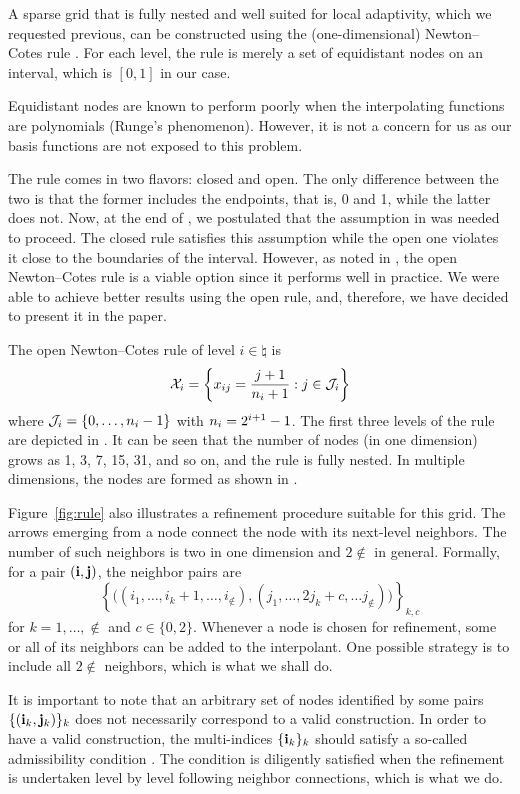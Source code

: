 A sparse grid that is fully nested and well suited for local adaptivity, which
we requested previous, can be constructed using the (one-dimensional)
Newton--Cotes rule \cite{klimke2006, ma2009}. For each level, the rule is merely
a set of equidistant nodes on an interval, which is $[0, 1]$ in our case.

\begin{remark}
Equidistant nodes are known to perform poorly when the interpolating functions
are polynomials (Runge's phenomenon). However, it is not a concern for us as our
basis functions are not exposed to this problem.
\end{remark}

The rule comes in two flavors: closed and open. The only difference between the
two is that the former includes the endpoints, that is, 0 and 1, while the
latter does not. Now, at the end of , we postulated that
the assumption in  was needed to proceed. The closed rule
satisfies this assumption while the open one violates it close to the boundaries
of the interval. However, as noted in \cite{klimke2006}, the open Newton--Cotes
rule is a viable option since it performs well in practice. We were able to
achieve better results using the open rule, and, therefore, we have decided to
present it in the paper.


The open Newton--Cotes rule of level $i \in \natural$ is
\begin{equation} \elab{newton-cotes-grid}
  \X_i = \left\{ x_{ij} = \frac{j + 1}{\n_i + 1}: j \in \index_i \right\}
\end{equation}
where $\mathcal{J}_i = \left\{ 0, \dots, n_i - 1 \right\}$ with $n_i = 2^{i + 1} -
1$. The first three levels of the rule are depicted in . It can be
seen that the number of nodes (in one dimension) grows as 1, 3, 7, 15, 31, and
so on, and the rule is fully nested. In multiple dimensions, the nodes are
formed as shown in .

Figure~\ref{fig:rule} also illustrates a refinement procedure suitable for this
grid. The arrows emerging from a node connect the node with its next-level
neighbors. The number of such neighbors is two in one dimension and $2 \nin$ in
general. Formally, for a pair $(\mathbf{i}, \mathbf{j})$, the neighbor pairs are
\[
  \left\{ \Big( (i_1, \dots, i_k + 1, \dots, i_\nin), (j_1, \dots, 2 j_k + c, \dots j_\nin) \Big) \right\}_{k, c}
\]
for $k = 1, \dots, \nin$ and $c \in \{ 0, 2 \}$. Whenever a node is chosen for
refinement, some or all of its neighbors can be added to the interpolant. One
possible strategy is to include all $2 \nin$ neighbors, which is what we shall
do.

\begin{remark}
It is important to note that an arbitrary set of nodes identified by some pairs
$\{ (\mathbf{i}_k, \mathbf{j}_k) \}_k$ does not necessarily correspond to a valid
construction. In order to have a valid construction, the multi-indices $\{ \mathbf{i}_k
\}_k$ should satisfy a so-called admissibility condition \cite{klimke2006}. The
condition is diligently satisfied when the refinement is undertaken level by
level following neighbor connections, which is what we do.
\end{remark}
